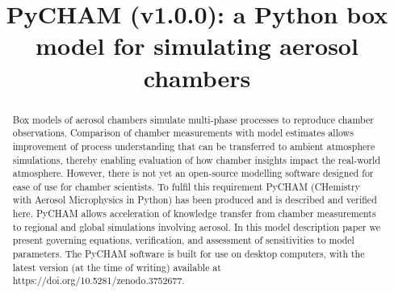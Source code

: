 \documentclass[gmd, manuscript]{copernicus}
\begin{document}
\title{PyCHAM (v1.0.0): a Python box model for simulating aerosol chambers}















\received{}
\pubdiscuss{} %
\revised{}
\accepted{}
\published{}




\maketitle



\begin{abstract}
Box models of aerosol chambers simulate multi-phase processes to reproduce chamber observations.  Comparison of chamber measurements with model estimates allows improvement of process understanding that can be transferred to ambient atmosphere simulations, thereby enabling evaluation of how chamber insights impact the real-world atmosphere.  However, there is not yet an open-source modelling software designed for ease of use for chamber scientists.  To fulfil this requirement PyCHAM (CHemistry with Aerosol Microphysics in Python) has been produced and is described and verified here.  PyCHAM allows acceleration of knowledge transfer from chamber measurements to regional and global simulations involving aerosol.  In this model description paper we present governing equations, verification, and assessment of sensitivities to model parameters.  The PyCHAM software is built for use on desktop computers, with the latest version (at the time of writing) available at https://doi.org/10.5281/zenodo.3752677.

\end{abstract}
\end{document}
